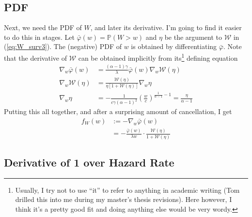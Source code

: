 \documentclass{article}
\newcommand{\bP}{\mathbb{P}}
\newcommand{\sW}{\mathscr{W}}
\begin{document}
\subsection{PDF}
\label{sec:pdf}

Next, we need the PDF of $W$, and later its derivative. I'm going to find it easier to do this in stages. Let $\bar{\varphi}(w) = \bP(W > w)$ and $\eta$ be the argument to $\sW$ in (\ref{eq:W_surv3}). The (negative) PDF of $w$ is obtained by differentiating $\bar{\varphi}$. Note that the derivative of $\sW$ can be obtained implicitly from its\footnote{Usually, I try not to use ``it'' to refer to anything in academic writing (Tom drilled this into me during my master's thesis revisions). Here however, I think it's a pretty good fit and doing anything else would be very wordy.} defining equation
%
\begin{align}
    \nabla_w \bar{\varphi}(w) &=  \frac{(\alpha - 1) \gamma}{\lambda} \bar{\varphi}(w) \nabla_w \sW (\eta)\\
    \nabla_w \sW(\eta) &= \frac{\sW(\eta)}{\eta [ 1 + \sW(\eta)]} \nabla_w \eta\\
    \nabla_w \eta &= - \frac{1}{c \gamma (\alpha - 1)^2} \left( \frac{w}{c} \right)^{\frac{1}{\alpha - 1} - 1} = \frac{\eta}{\alpha - 1}
\end{align}
%
Putting this all together, and after a surprising amount of cancellation, I get
%
\begin{align}
    f_W(w) &:= -\nabla_w \bar{\varphi}(w)\\
    &= - \frac{\bar{\varphi}(w)}{\lambda w} \cdot \frac{\sW(\eta)}{1 + \sW(\eta)}
\end{align}

\subsection{Derivative of 1 over Hazard Rate}
\end{document}
